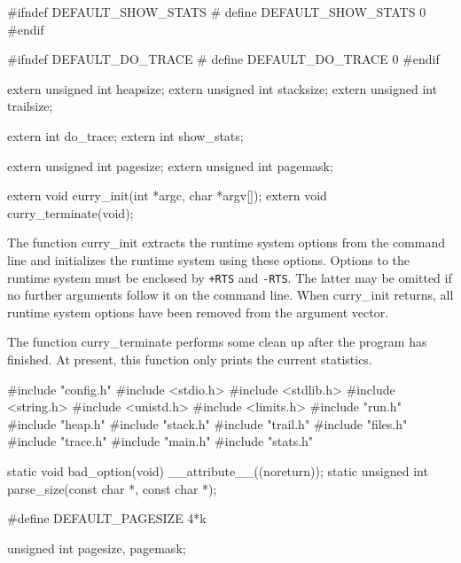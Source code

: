 #ifndef DEFAULT_SHOW_STATS
# define DEFAULT_SHOW_STATS 0
#endif

#ifndef DEFAULT_DO_TRACE
# define DEFAULT_DO_TRACE 0
#endif

extern unsigned int heapsize;
extern unsigned int stacksize;
extern unsigned int trailsize;

extern int do_trace;
extern int show_stats;

extern unsigned int pagesize;
extern unsigned int pagemask;

extern void curry_init(int *argc, char *argv[]);
extern void curry_terminate(void);

\nwendcode{}\nwdocspar
The function {\Tt{}curry{\_}init\nwendquote} extracts the runtime system options from
the command line and initializes the runtime system using these
options. Options to the runtime system must be enclosed by
\texttt{+RTS} and \texttt{-RTS}. The latter may be omitted if no
further arguments follow it on the command line. When {\Tt{}curry{\_}init\nwendquote}
returns, all runtime system options have been removed from the
argument vector.

The function {\Tt{}curry{\_}terminate\nwendquote} performs some clean up after the
program has finished. At present, this function only prints the
current statistics.

\nwenddocs{}\endmoddef\nwstartdeflinemarkup{}\nwenddeflinemarkup
#include "config.h"
#include <stdio.h>
#include <stdlib.h>
#include <string.h>
#include <unistd.h>
#include <limits.h>
#include "run.h"
#include "heap.h"
#include "stack.h"
#include "trail.h"
#include "files.h"
#include "trace.h"
#include "main.h"
#include "stats.h"

static void         bad_option(void) __attribute__((noreturn));
static unsigned int parse_size(const char *, const char *);

#define DEFAULT_PAGESIZE 4*k

unsigned int pagesize, pagemask;

